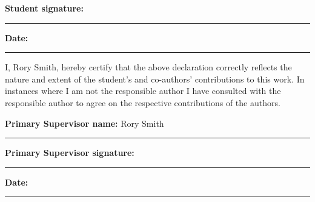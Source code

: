 {\textbf{Student signature:}
\rule[1em]{25em}{0.5pt}

\textbf{Date:}
\rule[1em]{25em}{0.5pt}

I, Rory Smith, hereby certify that the above declaration correctly reflects the
nature and extent of the student's and co-authors' contributions to this
work.
In instances where I am not the responsible author I have
consulted with the responsible author to agree on the respective
contributions of the authors.

\textbf{Primary Supervisor name:} Rory Smith
\rule[1em]{25em}{0.5pt}  %

\textbf{Primary Supervisor signature:}
\rule[1em]{25em}{0.5pt}  %

\textbf{Date:}
\rule[1em]{25em}{0.5pt}  %















}
